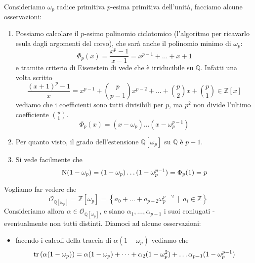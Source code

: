 \begin{esempio}
	Consideriamo $\omega_p$ radice primitiva $p$-esima primitiva dell'unità, facciamo alcune osservazioni:
	\begin{enumerate}
		\item Possiamo calcolare il $p$-esimo polinomio ciclotomico (l'algoritmo per ricavarlo esula dagli argomenti del corso), che sarà anche il polinomio minimo di $\omega_p$:
		\begin{equation*}
		\Phi_p(x)=\frac{x^p-1}{x-1}=x^{p-1}+\dots+x+1
		\end{equation*}
		e tramite criterio di Eisenstein di vede che è irriducibile su $\mathbb{Q}$. Infatti una volta scritto
		\begin{equation*}
		\frac{(x+1)^p-1}{x}=x^{p-1}+\binom{p}{p-1}x^{p-2}+\dots+\binom{p}{2}x+\binom{p}{1}\in\mathbb{Z}[x]
		\end{equation*}
		vediamo che i coefficienti sono tutti divisibili per $p$, ma $p^2$ non divide l'ultimo coefficiente $\binom{p}{1}$.
		\begin{equation*}
		\Phi_p(x)=(x-\omega_p)\dots(x-\omega_p^{p-1})
		\end{equation*}
		\item Per quanto visto, il grado dell'estensione $\mathbb{Q}[\omega_p]$ su $\mathbb{Q}$ è $p-1$.
		\item Si vede facilmente che
		\begin{equation*}
		\operatorname{N}(1-\omega_p)=(1-\omega_p)\dots(1-\omega_p^{p-1})=\Phi_p(1)=p
		\end{equation*}
	\end{enumerate}
	Vogliamo far vedere che 
	\begin{equation*}
	\mathcal{O}_{\mathbb{Q}[\omega_p]} =\mathbb{Z}[\omega_p]=\left\{a_0+\dots+a_{p-2}\omega_p^{p-2} \ \mid \ a_i\in\mathbb{Z}\right\}
	\end{equation*}
	Consideriamo allora $\alpha\in \mathcal{O}_{\mathbb{Q}[\omega_p]}$, e siano $\alpha_1,\dots,\alpha_{p-1}$ i suoi coniugati - eventualmente non tutti distinti. Diamoci ad alcune osservazioni:
	\begin{itemize}
		\item facendo i calcoli della traccia di $\alpha(1-\omega_p)$ vediamo che 
		\begin{equation*}
		\operatorname{tr}\left(\alpha(1-\omega_p)\right)=\alpha(1-\omega_p)+\dots+\alpha_2(1-\omega_p^2)+\dots\alpha_{p-1}(1-\omega_p^{p-1})
		\end{equation*}
		\begin{equation*}

\end{equation*}
\end{itemize}
\end{esempio}
